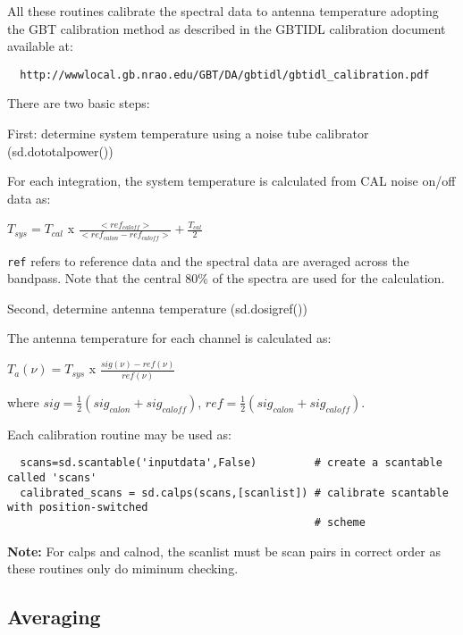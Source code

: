 All these routines calibrate the spectral data to antenna temperature
adopting the GBT calibration method as described in the
GBTIDL calibration document available at: 

\small
\begin{verbatim}
  http://wwwlocal.gb.nrao.edu/GBT/DA/gbtidl/gbtidl_calibration.pdf
\end{verbatim}
\normalsize

There are two basic steps:

First: determine system temperature using a noise tube calibrator
(sd.dototalpower()) 

For each integration, the system temperature is calculated from
CAL noise on/off data as:

$ T_{sys} = T_{cal}$ x 
$\frac{<ref_{caloff}>}{<ref_{calon} - ref_{caloff}>} + \frac{T_{cal}}{2} $

{\tt ref} refers to reference data and the spectral data are averaged
across the bandpass.  Note that the central 80\% of the spectra are
used for the calculation.

Second, determine antenna temperature (sd.dosigref())

The antenna temperature for each channel is calculated as:

$ T_a(\nu) = T_{sys}$ x 
$\frac{sig(\nu) - ref(\nu)}{ref(\nu)}$

where $sig = \frac{1}{2}(sig_{calon} + sig_{caloff})$, 
      $ref = \frac{1}{2}(sig_{calon} + sig_{caloff}).$


Each calibration routine may be used as:


\small
\begin{verbatim}
  scans=sd.scantable('inputdata',False)         # create a scantable called 'scans'
  calibrated_scans = sd.calps(scans,[scanlist]) # calibrate scantable with position-switched 
                                                # scheme
\end{verbatim}
\normalsize


{\bf Note:} For calps and calnod, the scanlist must be scan pairs in
correct order as these routines only do miminum checking.

\subsection{Averaging}
\label{subsubsection:sd.asap.averaging}

